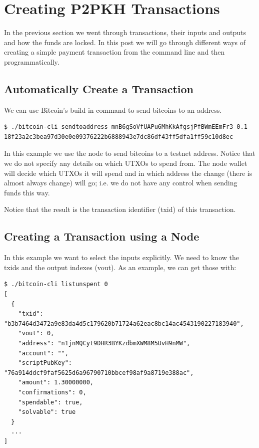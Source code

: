 \section{Creating P2PKH Transactions}

In the previous section we went through transactions, their inputs and outputs and how the funds are locked. In this post we will go through different ways of creating a simple payment transaction from the command line and then programmatically. 

\subsection*{Automatically Create a Transaction}

We can use Bitcoin's build-in command  to send bitcoins to an address.

\begin{emphbox}
\begin{lstlisting}[style=Bash]
$ ./bitcoin-cli sendtoaddress mnB6gSoVfUAPu6MhKkAfgsjPfBWmEEmFr3 0.1
18f23a2c3bea97d30e0e09376222b6888943e7dc86df43ff5dfa1ff59c10d8ec
\end{lstlisting}
\end{emphbox}

In this example we use the node to send  bitcoins to a testnet address. Notice that we do not specify any details on which UTXOs to spend from. The node wallet will decide which UTXOs it will spend and in which address the change (there is almost always change) will go; i.e. we do not have any control when sending funds this way.

\begin{note}
Notice that the result is the transaction identifier (txid) of this transaction.
\end{note}


\subsection*{Creating a Transaction using a Node}

In this example we want to select the inputs explicitly. We need to know the txids and the output indexes (vout). As an example, we can get those with:

\begin{emphbox}
\begin{lstlisting}[style=Bash]
$ ./bitcoin-cli listunspent 0
[
  {
    "txid": "b3b7464d3472a9e83da4d5c179620b71724a62eac8bc14ac4543190227183940",
    "vout": 0,
    "address": "n1jnMQCyt9DHR3BYKzdbmXWM8M5UvH9nMW",
    "account": "",
    "scriptPubKey": "76a914ddcf9faf5625d6a96790710bbcef98af9a8719e388ac",
    "amount": 1.30000000,
    "confirmations": 0,
    "spendable": true,
    "solvable": true
  }
  ...
]
\end{lstlisting}
\end{emphbox}

